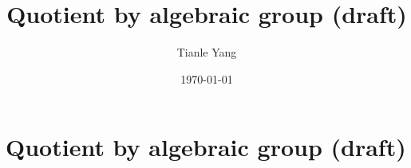 \documentclass{noteformyself}
\title{Quotient by algebraic group (draft)}
\author{Tianle Yang}
\date{\today}
\begin{document}
    \maketitle

    \section{Quotient by algebraic group (draft)}


\end{document}
